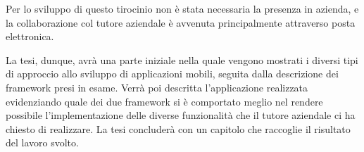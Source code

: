     Per lo sviluppo di questo tirocinio non è stata necessaria la presenza in
    azienda, e la collaborazione col tutore aziendale è avvenuta principalmente
    attraverso posta elettronica.

    La tesi, dunque, avrà una parte iniziale nella quale vengono mostrati i
    diversi tipi di approccio allo sviluppo di applicazioni mobili, seguita dalla
    descrizione dei framework presi in esame. Verrà poi descritta l'applicazione
    realizzata evidenziando quale dei due framework si è comportato meglio nel
    rendere possibile l'implementazione delle diverse funzionalità che il
    tutore aziendale ci ha chiesto di realizzare. La tesi concluderà con un capitolo
    che raccoglie il risultato del lavoro svolto.

